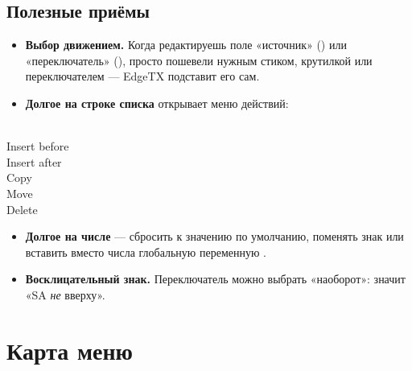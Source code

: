 \subsection{Полезные приёмы}

\begin{itemize}
  \item \textbf{Выбор движением.} Когда редактируешь поле «источник» () или
        «переключатель» (), просто пошевели нужным стиком, крутилкой или
        переключателем --- EdgeTX подставит его сам.
  \item \textbf{Долгое  на строке списка} открывает меню действий:
\end{itemize}

\begin{center}
%
{\\Insert before\\Insert after\\Copy\\Move\\Delete}
\end{center}

\begin{itemize}
  \item \textbf{Долгое  на числе} --- сбросить к значению по умолчанию, поменять знак
        или вставить вместо числа глобальную переменную .
  \item \textbf{Восклицательный знак.} Переключатель можно выбрать «наоборот»:  значит
        «SA \emph{не} вверху».
\end{itemize}

\section{Карта меню}

